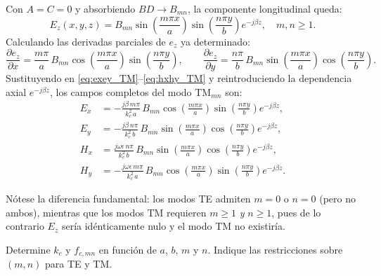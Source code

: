 \documentclass[
  11pt,
  letterpaper,
   addpoints,
   answers
  ]{exam}
\begin{document}
\begin{questions}
\begin{parts}
\begin{subparts}
\begin{solution}
\vspace{4pt}
Con $A=C=0$ y absorbiendo $BD\to B_{mn}$, la componente longitudinal queda:
\begin{equation}
E_z(x,y,z)=B_{mn}\sin\!\left(\frac{m\pi x}{a}\right)\sin\!\left(\frac{n\pi y}{b}\right)e^{-j\beta z},\quad m,n\geq 1.
\label{eq:Ez_TM_mn}
\end{equation}
Calculando las derivadas parciales de $e_z$ ya determinado:
\[
\frac{\partial e_z}{\partial x}=\frac{m\pi}{a}\,B_{mn}\cos\!\left(\frac{m\pi x}{a}\right)\sin\!\left(\frac{n\pi y}{b}\right),
\qquad
\frac{\partial e_z}{\partial y}=\frac{n\pi}{b}\,B_{mn}\sin\!\left(\frac{m\pi x}{a}\right)\cos\!\left(\frac{n\pi y}{b}\right).
\]
Sustituyendo en \eqref{eq:exey_TM}--\eqref{eq:hxhy_TM} y reintroduciendo la dependencia axial $e^{-j\beta z}$, los campos completos del modo TM$_{mn}$ son:
\begin{align}
E_x &= -\frac{j\beta\, m\pi}{k_c^2\, a}\,B_{mn}
\cos\!\left(\frac{m\pi x}{a}\right)\sin\!\left(\frac{n\pi y}{b}\right)e^{-j\beta z},
\label{eq:Ex_TM_mn}\\[6pt]
E_y &= -\frac{j\beta\, n\pi}{k_c^2\, b}\,B_{mn}
\sin\!\left(\frac{m\pi x}{a}\right)\cos\!\left(\frac{n\pi y}{b}\right)e^{-j\beta z},
\label{eq:Ey_TM_mn}\\[6pt]
H_x &= \frac{j\omega\epsilon\, n\pi}{k_c^2\, b}\,B_{mn}
\sin\!\left(\frac{m\pi x}{a}\right)\cos\!\left(\frac{n\pi y}{b}\right)e^{-j\beta z},
\label{eq:Hx_TM_mn}\\[6pt]
H_y &= -\frac{j\omega\epsilon\, m\pi}{k_c^2\, a}\,B_{mn}
\cos\!\left(\frac{m\pi x}{a}\right)\sin\!\left(\frac{n\pi y}{b}\right)e^{-j\beta z}.
\label{eq:Hy_TM_mn}
\end{align}

\noindent Nótese la diferencia fundamental: los modos TE admiten $m=0$ o $n=0$ (pero no ambos), mientras que los modos TM requieren
$m\geq 1$ \emph{y} $n\geq 1$, pues de lo contrario $E_z$ sería idénticamente nulo y el modo TM no existiría.
\end{solution}

\subpart Determine $k_c$ y $f_{c,mn}$ en función de $a$, $b$, $m$ y $n$. Indique las restricciones sobre $(m,n)$ para TE y TM.


\end{subparts}
\end{parts}
\end{questions}
\end{document}
